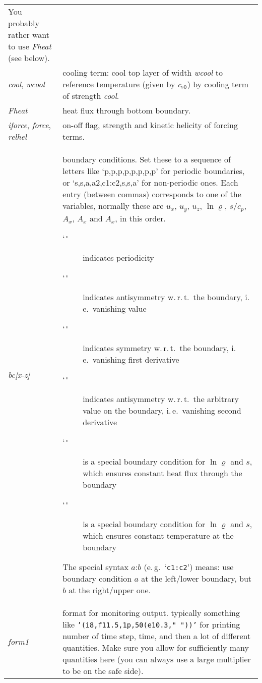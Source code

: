 \documentclass[12pt,twoside,notitlepage,a4paper]{article}
\makeatletter
\newcommand{\code}[1]{\texttt{#1}}
\newcommand{\var}[1]{\textsl{#1}\index{#1@\emph{#1}}\/}
\newcommand{\option}[1]{`\code{#1}'\index{#1@\emph{`#1'} option}}
\newcommand{\cs}            {c_{\rm s}}
\makeatother
\begin{document}
\begin{longtable}{lp{}}
                 You probably rather want to use \var{Fheat} (see below). \\
  \var{cool}, \var{wcool}
               & cooling term: cool top layer of width \var{wcool} to
                 reference temperature (given by ${\cs}_0$) by cooling term
                 of strength \var{cool}. \\
  \var{Fheat}  & heat flux through bottom boundary. \\
  \var{iforce}, \var{force}, \var{relhel}
               & on-off flag, strength and kinetic helicity of forcing
                 terms. \\
  \var{bc[x-z]}
               & boundary conditions. Set these to a sequence of letters 
                 like `p,p,p,p,p,p,p,p' for periodic boundaries, or
                 `s,s,a,a2,c1:c2,s,s,a' for non-periodic ones.
                 Each entry (between commas) corresponds to one of the
                 variables, normally these are $u_x$, $u_y$, $u_z$,
                 $\ln\varrho$, $s/c_p$, $A_x$, $A_x$ and $A_x$, in this
                 order.
                 \begin{description}
                 \item[\option{p}] indicates periodicity
                 \item[\option{a}] indicates antisymmetry w.\,r.\,t.~the
                   boundary, i.\,e.~vanishing value
                 \item[\option{s}] indicates symmetry w.\,r.\,t.~the
                   boundary, i.\,e.~vanishing first derivative
                 \item[\option{a2}] indicates antisymmetry w.\,r.\,t.~the
                   arbitrary value on the boundary, i.\,e.~vanishing
                   second derivative
                 \item[\option{c1}] is a special boundary condition for
                   $\ln\varrho$ and $s$, which ensures constant heat flux
                   through the boundary
                 \item[\option{c2}] is a special boundary condition for
                   $\ln\varrho$ and $s$, which ensures constant
                   temperature at the boundary 
                 \end{description}
                 The special syntax $a$:$b$ (e.\,g.~`\code{c1:c2}') means: use
                 boundary condition $a$ at the left/lower boundary, but
                 $b$ at the right/upper one. 
                 \\
  \var{form1}  & format for monitoring output. typically something like
                 \code{'(i8,f11.5,1p,50(e10.3," "))'} for printing number
                 of time step, time, and then a lot of different
                 quantities. Make sure you allow for sufficiently many
                 quantities here (you can always use a large multiplier to
                 be on the safe side). \\
\bottomrule
\end{longtable}
\end{document}
